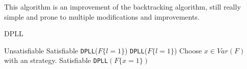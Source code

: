 This algorithm is an improvement of the backtracking algorithm, still really simple and prone to multiple modifications and improvements. 

\begin{algorithm}
  \caption{DPLL}\label{dpll}
  \begin{algorithmic}[1]
     \Return Unsatisfiable
    \EndIf
     \Return Satisfiable
    \EndIf
    \State
     \Return \texttt{DPLL}($F\{l=1\}$)
    \EndIf
     \Return \texttt{DPLL}($F\{l=1\}$)
  \EndIf
  \State
  \State Choose $x \in Var(F)$ with an strategy.
   \Return Satisfiable
  \EndIf
  \State \Return \texttt{DPLL}$(F\{x=1\})$
  \EndProcedure
\end{algorithmic}
\end{algorithm}

